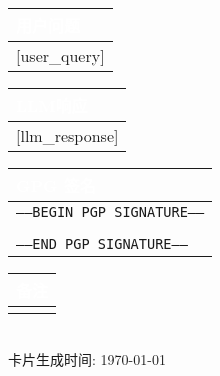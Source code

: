 \documentclass[a4paper,12pt]{article}
\begin{document}
\begin{tabularx}{\textwidth}{|X|}
    \hline
    \rowcolor{headercolor}\textcolor{white}{\textbf{用户问题}} \\
    \hline
    \begin{minipage}[t]{\linewidth-20pt}
        \vspace{5pt}
        [user_query]
        \vspace{5pt}
    \end{minipage} \\
    \hline
\end{tabularx}

\vspace{0.3cm}

\begin{tabularx}{\textwidth}{|X|}
    \hline
    \rowcolor{headercolor}\textcolor{white}{\textbf{LLM响应}} \\
    \hline
    \begin{minipage}[t]{\linewidth-20pt}
        \vspace{5pt}
        [llm_response]
        \vspace{5pt}
    \end{minipage} \\
    \hline
\end{tabularx}

\vspace{0.3cm}

\begin{tabularx}{\textwidth}{|X|}
    \hline
    \rowcolor{headercolor}\textcolor{white}{\textbf{GPG 签名}} \\
    \hline
    \texttt{-----BEGIN PGP SIGNATURE-----\\
    [签名内容]\\
    -----END PGP SIGNATURE-----} \\
    \hline
\end{tabularx}

\vspace{0.3cm}

\begin{tabularx}{\textwidth}{|X|}
    \hline
    \rowcolor{headercolor}\textcolor{white}{\textbf{备注}} \\
    \hline
    [remarks] \\
    \hline
\end{tabularx}

\begin{flushright}
    \\
    卡片生成时间: \today
\end{flushright}
\end{document}
